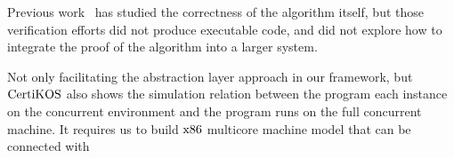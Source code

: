 
Previous work~\cite{lili16,ogata:mcs-lock} has studied the
correctness of the algorithm itself, but those verification efforts
did not produce executable code, and did not explore how to integrate
the proof of the algorithm into a larger system.

Not only facilitating the abstraction layer approach 
in our framework, but $\mathrm{CertiKOS}$
also shows the simulation relation 
between the program each instance on the concurrent environment 
and the program runs on the full concurrent machine. 
It requires us 
to build $\mathrm{x86}$ multicore machine 
model that can be connected with 


%
%
%
%


